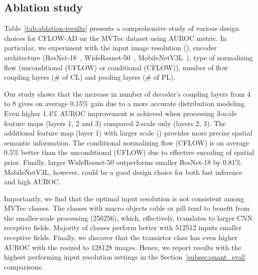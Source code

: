 \documentclass[10pt,twocolumn,letterpaper]{article}
\begin{document}
\subsection{Ablation study}
\label{subsec:ablation_eval}
Table~\ref{tab:ablation-results} presents a comprehensive study of various design choices for CFLOW-AD on the MVTec dataset using AUROC metric. In particular, we experiment with the input image resolution (), encoder architecture (ResNet-18~\cite{he}, WideResnet-50~\cite{BMVC2016_87}, MobileNetV3L~\cite{Howard_2019_ICCV}), type of normalizing flow (unconditional (UFLOW) or conditional (CFLOW)), number of flow coupling layers (\# of CL) and pooling layers (\# of PL).

Our study shows that the increase in number of decoder's coupling layers from 4 to 8 gives on average 0.15\% gain due to a more accurate distribution modeling. Even higher 1.4\% AUROC improvement is achieved when processing 3-scale feature maps (layers 1, 2 and 3) compared 2-scale only (layers 2, 3). The additional feature map (layer 1) with larger scale () provides more precise spatial semantic information. The conditional normalizing flow (CFLOW) is on average 0.5\% better than the unconditional (UFLOW) due to effective encoding of spatial prior. Finally, larger WideResnet-50 outperforms smaller ResNet-18 by 0.81\%. MobileNetV3L, however, could be a good design choice for both fast inference and high AUROC.

Importantly, we find that the optimal input resolution is not consistent among MVTec classes. The classes with macro objects \eg cable or pill tend to benefit from the smaller-scale processing (256256), which, effectively, translates to larger CNN receptive fields. Majority of classes perform better with 512512 inputs \ie smaller receptive fields. Finally, we discover that the transistor class has even higher AUROC with the resized to 128128 images. Hence, we report results with the highest performing input resolution settings in the Section~\ref{subsec:quant_eval} comparisons.
\end{document}
